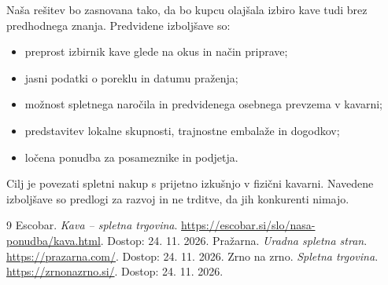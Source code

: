 \documentclass[a4paper,11pt]{article}
\begin{document}
Naša rešitev bo zasnovana tako, da bo kupcu olajšala izbiro kave tudi brez predhodnega znanja. Predvidene izboljšave so:
\begin{itemize}
\item preprost izbirnik kave glede na okus in način priprave;
\item jasni podatki o poreklu in datumu praženja;
\item možnost spletnega naročila in predvidenega osebnega prevzema v kavarni;
\item predstavitev lokalne skupnosti, trajnostne embalaže in dogodkov;
\item ločena ponudba za posameznike in podjetja.
\end{itemize}
Cilj je povezati spletni nakup s prijetno izkušnjo v fizični kavarni. Navedene izboljšave so predlogi za razvoj in ne trditve, da jih konkurenti nimajo.
\begin{thebibliography}{9}
 Escobar. \emph{Kava -- spletna trgovina}. \url{https://escobar.si/slo/nasa-ponudba/kava.html}. Dostop: 24. 11. 2026.
 Pražarna. \emph{Uradna spletna stran}. \url{https://prazarna.com/}. Dostop: 24. 11. 2026.
 Zrno na zrno. \emph{Spletna trgovina}. \url{https://zrnonazrno.si/}. Dostop: 24. 11. 2026.
\end{thebibliography}
\end{document}
